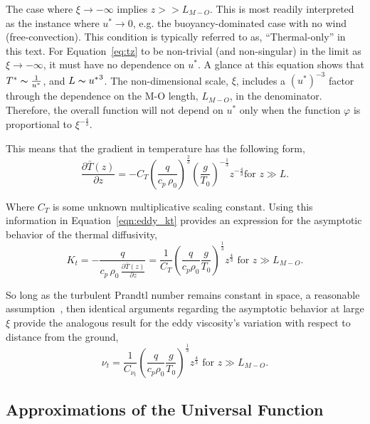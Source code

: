 The case where $\xi \to -\infty $ implies $z>>L_{M-O}$.  
This is most readily interpreted as the instance
where $u^* \to 0$, e.g. the buoyancy-dominated case with no wind
(free-convection). This condition is typically referred to as,
``Thermal-only'' in this text. 
%
For Equation~\ref{eq:tz} to be non-trivial (and
non-singular) in the limit as $\xi \to -\infty$, it must have no
dependence on $u^*$. A glance at this equation shows that
$T^* \thicksim \frac{1}{u^*}$, and $L \thicksim
{u^*}^{3}$. The non-dimensional scale, $\xi$, includes a
$(u^*)^{-3}$ factor through the dependence on the M-O length, 
$L_{M-O}$, in the denominator. 
Therefore, the overall function will not depend on $u^*$ only when
the function $\varphi$ is proportional to  $\xi^{-\frac{4}{3}}$. 

This means that the gradient in temperature has the following form,
\begin{equation}
\frac{\partial \bar T(z)}{\partial z} = -C_T \left(\frac{q}{c_p \,
					      \rho_0}\right)^\frac{2}{3}
\left( \frac{g}{T_0} \right)^{-\frac{1}{3}} z^{-\frac{4}{3}}  \text{
for } z \gg L.
\end{equation}

Where $C_T$ is some unknown multiplicative scaling constant. 
Using this information in Equation~\ref{eqn:eddy_kt} provides an
expression for the asymptotic behavior of the thermal diffusivity, 
\begin{equation}
 K_t = -\frac{q}{c_p \, \rho_0 \, \frac{\partial \bar T(z)}{\partial z}}
  = \frac{1}{C_T} \left( \frac{q}{c_p \rho_0} \frac{g}{T_0}
		     \right)^\frac{1}{3} z^{\frac{4}{3}}  \text{ 
for } z \gg L_{M-O}. 
\end{equation}

So long as the turbulent Prandtl number remains constant in space, a
reasonable assumption~\cite{chuang1969turbulent}, then 
identical arguments regarding the asymptotic behavior at large $\xi$
provide the analogous result for the eddy viscosity's variation with
respect to distance from the ground,   
\begin{equation}
 \nu_t = \frac{1}{C_{\nu_t}} \left( \frac{q}{c_p \rho_0} \frac{g}{T_0}
			     \right)^\frac{1}{3} z^{\frac{4}{3}}  \text{ 
for } z \gg L_{M-O}. 
\end{equation}


\subsection*{Approximations of the Universal Function}


